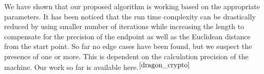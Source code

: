 \documentclass[a4paper,12pt]{article}
\begin{document}
\begin{flushleft}
    We have shown that our proposed algorithm is working based on the appropriate parameters. It has been noticed that the run time complexity can be drastically reduced by using smaller number of iterations while increasing the length to compensate for the precision of the endpoint as well as the Euclidean distance from the start point. So far no edge cases have been found, but we suspect the presence of one or more. This is dependent on the calculation precision of the machine. Our work so far is available here.$^{\cite{dragon_crypto}}$
\end{flushleft}



\end{document}
